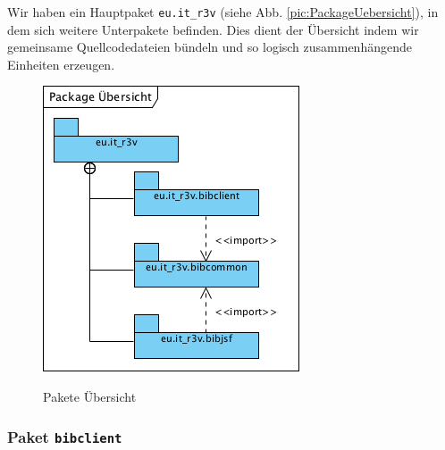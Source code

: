 \documentclass[fontsize=12pt,paper=a4,twoside]{scrartcl}
\begin{document}
Wir haben ein Hauptpaket \texttt{eu.it\_r3v} (siehe Abb. \vref{pic:PackageUebersicht}), in dem sich weitere Unterpakete befinden. Dies dient der Übersicht indem wir gemeinsame Quellcodedateien bündeln und so logisch zusammenhängende Einheiten erzeugen.

\begin{figure} [H] 
\caption{Pakete Übersicht} \centering
	\includegraphics[scale=1.55]{Diagramme/PackageUebersicht.png} 
	\label{pic:PackageUebersicht} 
\end{figure}
\label{sec:PackageUebersicht}

\subsubsection{Paket \texttt{bibclient}}
\label{sec:bibclient}
\end{document}
